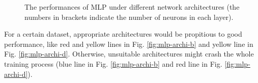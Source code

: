 \documentclass[12pt,a4paper]{article}
\theoremstyle{definition}
\begin{document}
\begin{figure}[H]
	\centering
	\caption{The performances of MLP under different network architectures (the numbers in brackets indicate the number of neurons in each layer).}
	\label{fig:mlp-archi}
\end{figure}

For a certain dataset, appropriate architectures would be propitious to good performance, like red and yellow lines in Fig. \ref{fig:mlp-archi-b} and yellow line in Fig. \ref{fig:mlp-archi-d}. Otherwise, unsuitable architectures might crash the whole training process (blue line in Fig. \ref{fig:mlp-archi-b} and red line in Fig. \ref{fig:mlp-archi-d}).
\end{document}
